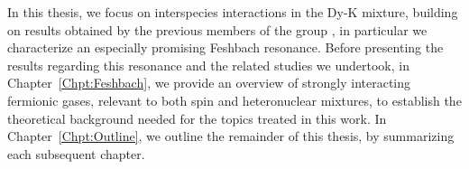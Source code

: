 In this thesis, we focus on	 interspecies interactions in the Dy-K mixture, building on results obtained by the previous members of the group \cite{Ravensbergen2020PhD,Soave2022PhD,Kreyer2023Phd}, in particular we characterize an especially promising Feshbach resonance. Before presenting the results regarding this resonance and the related studies we undertook, in Chapter~\ref{Chpt:Feshbach}, we provide an overview of strongly interacting fermionic gases, relevant to both spin and heteronuclear mixtures, to establish the theoretical background needed for the topics treated in this work. In Chapter~\ref{Chpt:Outline},  we outline the remainder of this thesis, by summarizing each subsequent chapter.
 




 
 


